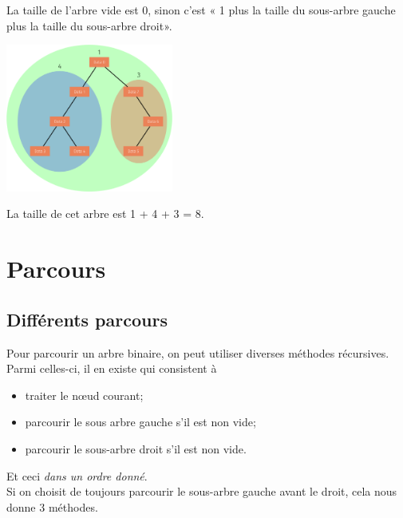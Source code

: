 \documentclass[10pt,firamath,cours]{nsi}
\begin{document}
\begin{exemple}[]
    La taille de l'arbre vide est 0, sinon c'est « 1 plus la taille du sous-arbre gauche plus la taille du sous-arbre droit».
    \begin{center}
        \includegraphics[width=5.5cm]{img/taille}
    \end{center}
    La taille de cet arbre est 1 + 4 + 3 = 8.   
\end{exemple}


\section{Parcours}
\subsection{Différents parcours}
Pour parcourir un arbre binaire, on peut utiliser diverses méthodes récursives.\\
Parmi celles-ci, il en existe qui consistent à\\ 
\begin{itemize}
    \item traiter le n\oe ud courant;\\
    \item parcourir le sous arbre gauche s'il est non vide;\\
    \item parcourir le sous-arbre droit s'il est non vide.\\
\end{itemize}
Et ceci \textit{dans un ordre donné}.\\
Si on choisit de toujours parcourir le sous-arbre gauche avant le droit, cela nous donne 3 méthodes.
\end{document}
